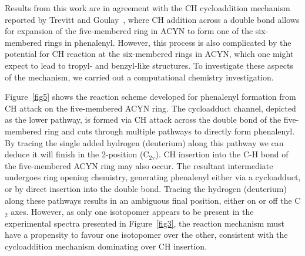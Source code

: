 \documentclass[journal=jacsat,manuscript=article,layout=onecolumn]{achemso}
\begin{document}
Results from this work are in agreement with the CH cycloaddition mechanism reported by Trevitt and Goulay~\cite{tre16}, where CH addition across a double bond allows for expansion of the five-membered ring in ACYN to form one of the six-membered rings in phenalenyl. However, this process is also complicated by the potential for CH reaction at the six-membered rings in ACYN, which one might expect to lead to tropyl- and benzyl-like structures. To investigate these aspects of the mechanism, we carried out a computational chemistry investigation.



Figure~\ref{fig5} shows the reaction scheme developed for phenalenyl formation from CH attack on the five-membered ACYN ring. The cycloadduct channel, depicted as the lower pathway, is formed via CH attack across the double bond of the five-membered ring and cuts through multiple pathways to directly form phenalenyl. By tracing the single added hydrogen (deuterium) along this pathway we can deduce it will finish in the 2-position (C$_{2\mathrm{v}}$). CH insertion into the C-H bond of the five-membered ACYN ring may also occur. The resultant intermediate undergoes ring opening chemistry, generating phenalenyl either via a cycloadduct, or by direct insertion into the double bond. Tracing the hydrogen (deuterium) along these pathways results in an ambiguous final position, either on or off the C$_2$ axes. However, as only one isotopomer appears to be present in the experimental spectra presented in Figure~\ref{fig3}, the reaction mechanism must have a propensity to favour one isotopomer over the other, consistent with the cycloaddition mechanism dominating over CH insertion. 



\end{document}
